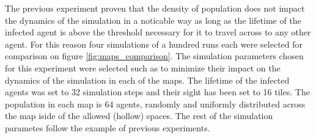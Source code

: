 


The previous experiment proven that the density of population does not impact the dynamics of the simulation in a noticable way as long as the lifetime of the infected agent is above the threshold necessary for it to travel across to any other agent.
For this reason four simulations of a hundred runs each were selected for comparison on figure \ref{fig:maps_comparison}.
The simulation parameters chosen for this experiment were selected such as to minimize their impact on the dynamics of the simulation in each of the maps.
The lifetime of the infected agents was set to 32 simulation steps and their sight has been set to 16 tiles.
The population in each map is 64 agents, randomly and uniformly distributed across the map iside of the allowed (hollow) spaces.
The rest of the simulation parametes follow the example of previous experiments.

